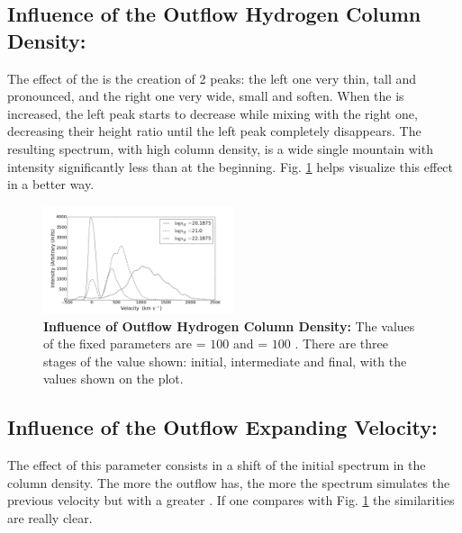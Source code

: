 \subsection{Influence of the Outflow Hydrogen Column Density: \lognh }

The effect of the \lognh is the creation of 2 peaks: the left one very thin, tall and pronounced, and the right one very wide, small and soften. When the \lognh is increased, the left peak starts to decrease while mixing with the right one, decreasing their height ratio until the left peak completely disappears. The resulting spectrum, with high column density, is a wide single mountain with intensity significantly less than at the beginning. Fig. \ref{fig:influence_lognH} helps visualize this effect in a better way.\\

\begin{figure}[h!]
	\begin{center}
		\includegraphics[width=0.5\textwidth]{./figures/appendix/inf_lognh_soft.png}
	\end{center}
	\caption{\textbf{Influence of Outflow Hydrogen Column Density:} The values of the fixed parameters are \vout = $100$ \kms and \vrot = $100$ \kms. There are three stages of the \lognh value shown: initial, intermediate and final, with the values shown on the plot.}
	\label{fig:influence_lognH}
\end{figure}

\subsection{Influence of the Outflow Expanding Velocity: \vout }

The effect of this parameter consists in a shift of the initial spectrum in the column density. The more \vout the outflow has, the more the spectrum simulates the previous velocity but with a greater \lognh. If one compares with Fig. \ref{fig:influence_lognH} the similarities are really clear. \\

